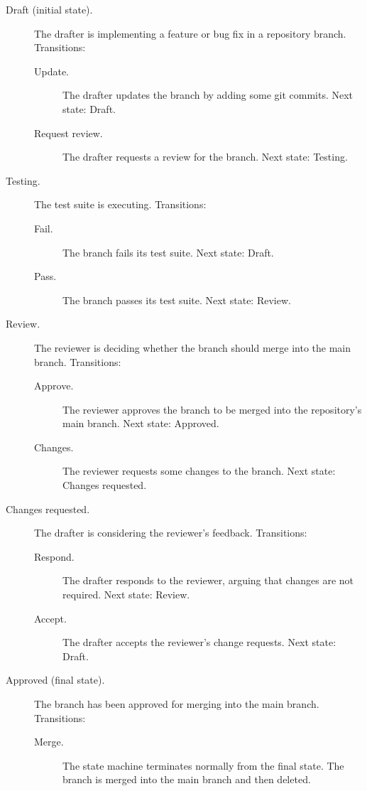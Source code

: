 \documentclass[../midgard.tex]{subfiles}
\begin{document}
\begin{description}
    \item[Draft (initial state).] The drafter is implementing a feature or bug fix in a repository branch.
      Transitions:
        \begin{description}
            \item[Update.] The drafter updates the branch by adding some git commits.
              Next state: Draft.
            \item[Request review.] The drafter requests a review for the branch.
              Next state: Testing.
        \end{description}
    \item[Testing.] The test suite is executing.
      Transitions:
        \begin{description}
            \item[Fail.] The branch fails its test suite.
              Next state: Draft.
            \item[Pass.] The branch passes its test suite.
              Next state: Review.
        \end{description}
    \item[Review.] The reviewer is deciding whether the branch should merge into the main branch.
      Transitions:
        \begin{description}
            \item[Approve.] The reviewer approves the branch to be merged into the repository's main branch.
              Next state: Approved.
            \item[Changes.] The reviewer requests some changes to the branch.
              Next state: Changes requested.
        \end{description}
    \item[Changes requested.] The drafter is considering the reviewer's feedback.
      Transitions:
        \begin{description}
            \item[Respond.] The drafter responds to the reviewer, arguing that changes are not required.
              Next state: Review.
            \item[Accept.] The drafter accepts the reviewer's change requests.
              Next state: Draft.
        \end{description}
    \item[Approved (final state).] The branch has been approved for merging into the main branch.
      Transitions:
        \begin{description}
            \item[Merge.] The state machine terminates normally from the final state.
              The branch is merged into the main branch and then deleted.
        \end{description}
\end{description}
\end{document}
